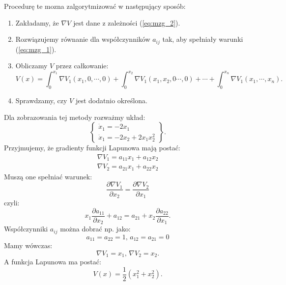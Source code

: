 \documentclass{article}
\begin{document}
        Procedurę te mozna zalgorytmizować w następujący sposób:
        \begin{enumerate}
            \item Zakładamy, że $\nabla V$ jest dane z zależności (\ref{eq:mzg_2}).
            \item Rozwiązujemy równanie dla współczynników $a_{ij}$ tak, aby spełniały warunki (\ref{eq:mzg_1}).
            \item Obliczamy $V$ przez całkowanie:
            $$
                V(x) = \int_{0}^{x_{1}}{\nabla V_{1}(x_{1}, 0,\cdots, 0)} + \int_{0}^{x_{2}}{\nabla V_{1}(x_{1}, x_{2}, 0 \cdots, 0)} + \cdots + \int_{0}^{x_{n}}{\nabla V_{1}(x_{1}, \cdots, x_{n})}.
            $$
            \item Sprawdzamy, czy $V$ jest dodatnio określona.
        \end{enumerate}

        \begin{tcolorbox}[colback=green!5, colframe=green!75!black, title=Przykład]
        Dla zobrazowania tej metody rozważmy układ:
        $$
            \left\{
            \begin{array}{l}
                 \dot{x}_{1} = -2x_{1}\\
                 \dot{x}_{1} = -2x_{2} + 2x_{1}x_{2}^{2}
            \end{array}
            \right\}.
        $$
        Przyjmujemy, że gradienty funkcji Lapunowa mają postać:
        $$
            \begin{array}{l}
                 \nabla V_{1} = a_{11}x_{1} + a_{12}x_{2}\\
                 \nabla V_{2} = a_{21}x_{1} + a_{22}x_{2}
            \end{array}
        $$
        Muszą one spełniać warunek:
        $$
            \frac{\partial \nabla V_{1}}{\partial x_{2}} = \frac{\partial \nabla V_{2}}{\partial x_{1}}
        $$
        czyli:
        $$
            x_{1}\frac{\partial a_{11}}{\partial x_{2}} + a_{12} = a_{21} + x_{2}\frac{\partial a_{22}}{\partial x_{1}}.
        $$
        Współczynniki $a_{ij}$ można dobrać np. jako:
        $$
            a_{11} = a_{22} = 1,\,a_{12}=a_{21}=0
        $$
        Mamy wówczas:
        $$
            \nabla V_{1} = x_{1},\,\nabla V_{2} = x_{2}.
        $$
        A funkcja Lapunowa ma postać:
        $$
            V(x) = \frac{1}{2}(x_{1}^{2} + x_{2}^{2}).
        $$
        \end{tcolorbox}

\end{document}
